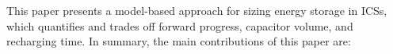 This paper presents a model-based approach for sizing energy storage in ICSs, which quantifies and trades off forward progress, capacitor volume, and recharging time. 
In summary, the main contributions of this paper are: 
\color{blue}
